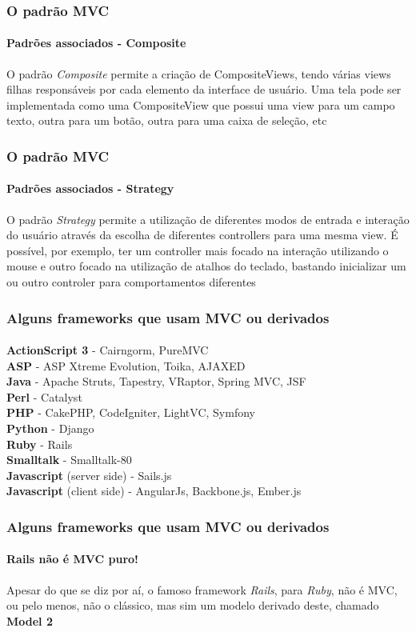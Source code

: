 \documentclass{beamer}
\begin{document}
\begin{frame}
\frametitle{O padrão MVC}
\framesubtitle{Padrões associados - Composite}
	O padrão \textit{Composite} permite a criação de CompositeViews, tendo várias views filhas responsáveis por cada elemento da interface de usuário. Uma tela pode ser implementada como uma CompositeView que possui uma view para um campo texto, outra para um botão, outra para uma caixa de seleção, etc
\end{frame}

\begin{frame}
\frametitle{O padrão MVC}
\framesubtitle{Padrões associados - Strategy}
	O padrão \textit{Strategy} permite a utilização de diferentes modos de entrada e interação do usuário através da escolha de diferentes controllers para uma mesma view. É possível, por exemplo, ter um controller mais focado na interação utilizando o mouse e outro focado na utilização de atalhos do teclado, bastando inicializar um ou outro controler para comportamentos diferentes
\end{frame}

\begin{frame}
\frametitle{Alguns frameworks que usam MVC ou derivados}
\framesubtitle{}
	\textbf{ActionScript 3} - Cairngorm, PureMVC\\
	\textbf{ASP} - ASP Xtreme Evolution, Toika, AJAXED\\
	\textbf{Java} - Apache Struts, Tapestry, VRaptor, Spring MVC, JSF\\
	\textbf{Perl} - Catalyst\\
	\textbf{PHP} - CakePHP, CodeIgniter, LightVC, Symfony\\
	\textbf{Python} - Django\\
	\textbf{Ruby} - Rails\\
	\textbf{Smalltalk} - Smalltalk-80\\
	\textbf{Javascript} (server side) - Sails.js\\
	\textbf{Javascript} (client side) - AngularJs, Backbone.js, Ember.js\\
\end{frame}

\begin{frame}
\frametitle{Alguns frameworks que usam MVC ou derivados}
\framesubtitle{Rails não é MVC puro!}
	Apesar do que se diz por aí, o famoso framework \textit{Rails}, para \textit{Ruby}, não é MVC, ou pelo menos, não o clássico,
	mas sim um modelo derivado deste, chamado \textbf{Model 2}
\end{frame}
\end{document}

